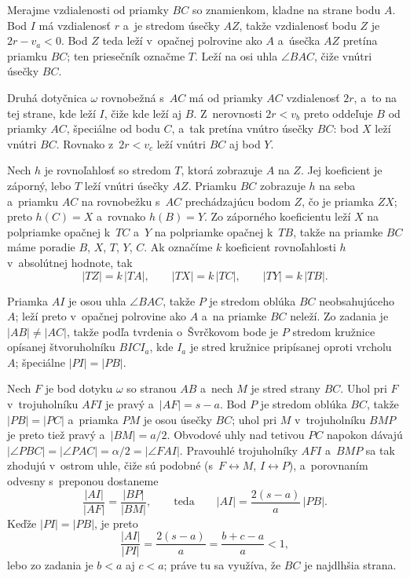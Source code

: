 {    Merajme vzdialenosti od priamky $BC$ so znamienkom, kladne na strane bodu $A$. Bod $I$ má vzdialenosť $r$ a~je stredom úsečky $AZ$, takže vzdialenosť bodu $Z$ je $2r - v_a < 0$. Bod $Z$ teda leží v~opačnej polrovine ako $A$ a~úsečka $AZ$ pretína priamku $BC$; ten priesečník označme $T$. Leží na osi uhla $\angle BAC$, čiže vnútri úsečky $BC$.

    Druhá dotyčnica $\omega$ rovnobežná s~$AC$ má od priamky $AC$ vzdialenosť $2r$, a~to na tej strane, kde leží $I$, čiže kde leží aj $B$. Z~nerovnosti $2r < v_b$ preto oddeľuje $B$ od priamky $AC$, špeciálne od bodu $C$, a~tak pretína vnútro úsečky $BC$: bod $X$ leží vnútri $BC$. Rovnako z~$2r < v_c$ leží vnútri $BC$ aj bod $Y$.

    Nech $h$ je rovnoľahlosť so stredom $T$, ktorá zobrazuje $A$ na $Z$. Jej koeficient je záporný, lebo $T$ leží vnútri úsečky $AZ$. Priamku $BC$ zobrazuje $h$ na seba a~priamku $AC$ na rovnobežku s~$AC$ prechádzajúcu bodom $Z$, čo je priamka $ZX$; preto $h(C) = X$ a~rovnako $h(B) = Y$. Zo záporného koeficientu leží $X$ na polpriamke opačnej k~$TC$ a~$Y$ na polpriamke opačnej k~$TB$, takže na priamke $BC$ máme poradie $B$, $X$, $T$, $Y$, $C$. Ak označíme $k$ koeficient rovnoľahlosti $h$ v~absolútnej hodnote, tak
    $$
    |TZ| = k \, |TA|, \qquad |TX| = k \, |TC|, \qquad |TY| = k \, |TB|.
    $$

    Priamka $AI$ je osou uhla $\angle BAC$, takže $P$ je stredom oblúka $BC$ neobsahujúceho $A$; leží preto v~opačnej polrovine ako $A$ a~na priamke $BC$ neleží. Zo zadania je $|AB| \neq |AC|$, takže podľa tvrdenia o~Švrčkovom bode je $P$ stredom kružnice opísanej štvoruholníku $BICI_a$, kde $I_a$ je stred kružnice pripísanej oproti vrcholu $A$; špeciálne $|PI| = |PB|$.

    Nech $F$ je bod dotyku $\omega$ so stranou $AB$ a~nech $M$ je stred strany $BC$. Uhol pri $F$ v~trojuholníku $AFI$ je pravý a~$|AF| = s - a$. Bod $P$ je stredom oblúka $BC$, takže $|PB| = |PC|$ a~priamka $PM$ je osou úsečky $BC$; uhol pri $M$ v~trojuholníku $BMP$ je preto tiež pravý a~$|BM| = a/2$. Obvodové uhly nad tetivou $PC$ napokon dávajú $|\angle PBC| = |\angle PAC| = \alpha/2 = |\angle FAI|$. Pravouhlé trojuholníky $AFI$ a~$BMP$ sa tak zhodujú v~ostrom uhle, čiže sú podobné (s~$F \leftrightarrow M$, $I \leftrightarrow P$), a~porovnaním odvesny s~preponou dostaneme
    $$
    \frac{|AI|}{|AF|} = \frac{|BP|}{|BM|}, \qquad \text{teda} \qquad |AI| = \frac{2(s-a)}{a}\,|PB|.
    $$
    Keďže $|PI| = |PB|$, je preto
    $$
    \frac{|AI|}{|PI|} = \frac{2(s-a)}{a} = \frac{b+c-a}{a} < 1,
    $$
    lebo zo zadania je $b < a$ aj $c < a$; práve tu sa využíva, že $BC$ je najdlhšia strana.

}
